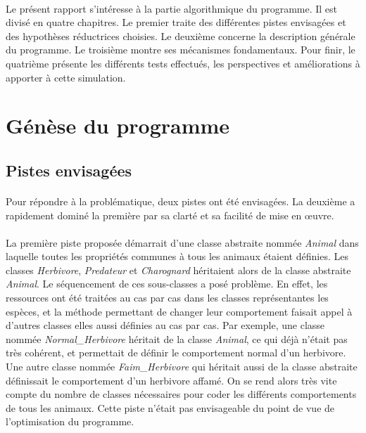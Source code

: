\documentclass[a4paper,11pt,final,oneside]{article}
\begin{document}
\paragraph{} Le présent rapport s'intéresse à la partie algorithmique du programme. Il est divisé en quatre chapitres. Le premier traite des différentes pistes envisagées et des hypothèses réductrices choisies. Le deuxième concerne la description générale du programme. Le troisième montre ses mécanismes fondamentaux. Pour finir, le quatrième présente les différents tests effectués, les perspectives et améliorations à apporter à cette simulation.

\newpage

	\section{Génèse du programme}
	\label{sec:gen}

		\subsection{Pistes envisagées}

\paragraph{} Pour répondre à la problématique, deux pistes ont été envisagées. La deuxième a rapidement dominé la première par sa clarté et sa facilité de mise en \oe{}uvre.

\paragraph{} La première piste proposée démarrait d'une classe abstraite nommée \textit{Animal} dans laquelle toutes les propriétés communes à tous les animaux étaient définies. Les classes \textit{Herbivore}, \textit{Predateur} et \textit{Charognard} héritaient alors de la classe abstraite \textit{Animal}. Le séquencement de ces sous-classes a posé problème. En effet, les ressources ont été traitées au cas par cas dans les classes représentantes les espèces, et la méthode permettant de changer leur comportement faisait appel à d'autres classes elles aussi définies au cas par cas. Par exemple, une classe nommée \textit{Normal\_Herbivore} héritait de la classe \textit{Animal}, ce qui déjà n'était pas très cohérent, et permettait de définir le comportement normal d'un herbivore. Une autre classe nommée \textit{Faim\_Herbivore} qui héritait aussi de la classe abstraite définissait le comportement d'un herbivore affamé. On se rend alors très vite compte du nombre de classes nécessaires pour coder les différents comportements de tous les animaux. Cette piste n'était pas envisageable du point de vue de l'optimisation du programme.
\end{document}
